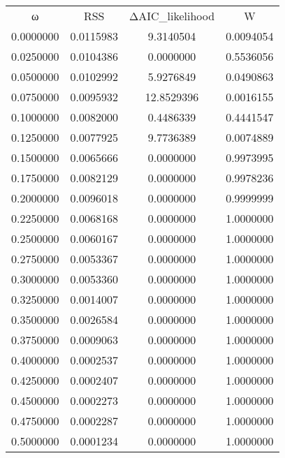 \begin{tabular}{cccc}
ω & RSS & ΔAIC_likelihood & W\\
0.0000000 & 0.0115983 & 9.3140504 & 0.0094054\\
0.0250000 & 0.0104386 & 0.0000000 & 0.5536056\\
0.0500000 & 0.0102992 & 5.9276849 & 0.0490863\\
0.0750000 & 0.0095932 & 12.8529396 & 0.0016155\\
0.1000000 & 0.0082000 & 0.4486339 & 0.4441547\\
0.1250000 & 0.0077925 & 9.7736389 & 0.0074889\\
0.1500000 & 0.0065666 & 0.0000000 & 0.9973995\\
0.1750000 & 0.0082129 & 0.0000000 & 0.9978236\\
0.2000000 & 0.0096018 & 0.0000000 & 0.9999999\\
0.2250000 & 0.0068168 & 0.0000000 & 1.0000000\\
0.2500000 & 0.0060167 & 0.0000000 & 1.0000000\\
0.2750000 & 0.0053367 & 0.0000000 & 1.0000000\\
0.3000000 & 0.0053360 & 0.0000000 & 1.0000000\\
0.3250000 & 0.0014007 & 0.0000000 & 1.0000000\\
0.3500000 & 0.0026584 & 0.0000000 & 1.0000000\\
0.3750000 & 0.0009063 & 0.0000000 & 1.0000000\\
0.4000000 & 0.0002537 & 0.0000000 & 1.0000000\\
0.4250000 & 0.0002407 & 0.0000000 & 1.0000000\\
0.4500000 & 0.0002273 & 0.0000000 & 1.0000000\\
0.4750000 & 0.0002287 & 0.0000000 & 1.0000000\\
0.5000000 & 0.0001234 & 0.0000000 & 1.0000000\\
\end{tabular}
